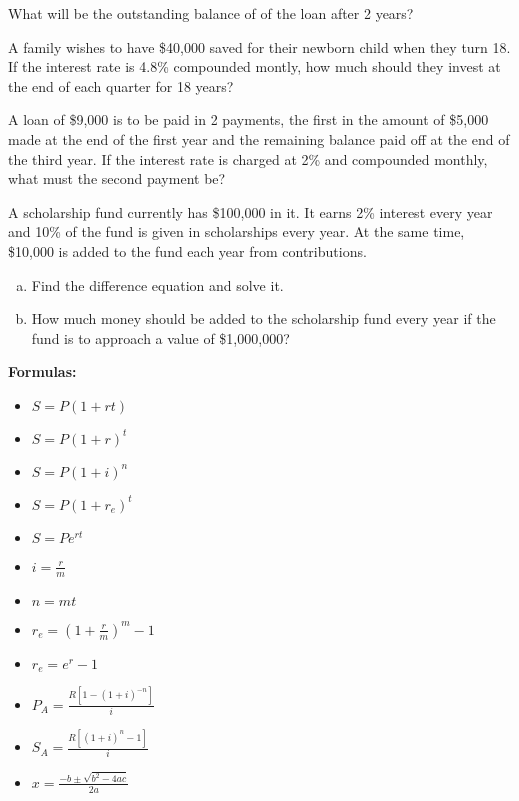 \documentclass[12pt,legalpaper]{exam}
\newcommand{\ds}{\displaystyle}
\begin{document}
\begin{questions}
\begin{compactenum}[(a)]
\item What will be the outstanding balance of of the loan after 2 years?
\end{compactenum}
\newpage

\question[3] A family wishes to have \$40,000 saved for their newborn child when they turn 18.  If the interest rate is 4.8\% compounded montly, how much should they invest at the end of each quarter for 18 years?
\vspace{13cm}

\question[3] A loan of \$9,000 is to be paid in 2 payments, the first in the amount of \$5,000 made at the end of the first year and the remaining balance paid off at the end of the third year.  If the interest rate is charged at 2\% and compounded monthly, what must the second payment be?
\newpage

\question[7] A scholarship fund currently has \$100,000 in it.  It earns 2\% interest every year and 10\% of the fund is given in scholarships every year.  At the same time, \$10,000 is added to the fund each year from contributions.
\begin{enumerate}[(a)]
\item Find the difference equation and solve it.
\vfill

\item How much money should be added to the scholarship fund every year if the fund is to approach a value of \$1,000,000?
\vfill

\end{enumerate}
\newpage

\end{questions}
\large
\textbf{Formulas:}
\begin{itemize}
\item $\ds{S = P(1 + rt)}$
\item $\ds{S = P(1 + r)^t}$
\item $\ds{S = P(1 + i)^n}$
\item $\ds{S = P(1 + r_{e})^{t}}$
\item $\ds{S = Pe^{rt}}$
\item $\ds{i = \frac{r}{m}}$
\item $\ds{n = mt}$
\item $\ds{r_{e} = \left(1 + \frac{r}{m}\right)^{m} - 1}$
\item $\ds{r_{e} = e^{r} - 1}$
\item $\ds{P_{A} = \frac{R[1 - (1 + i)^{-n}]}{i}}$
\item $\ds{S_{A} = \frac{R[(1 + i)^{n} - 1]}{i}}$
\item $\ds{x = \frac{-b \pm \sqrt{b^2 - 4ac}}{2a}}$
\end{itemize}
\end{document}
